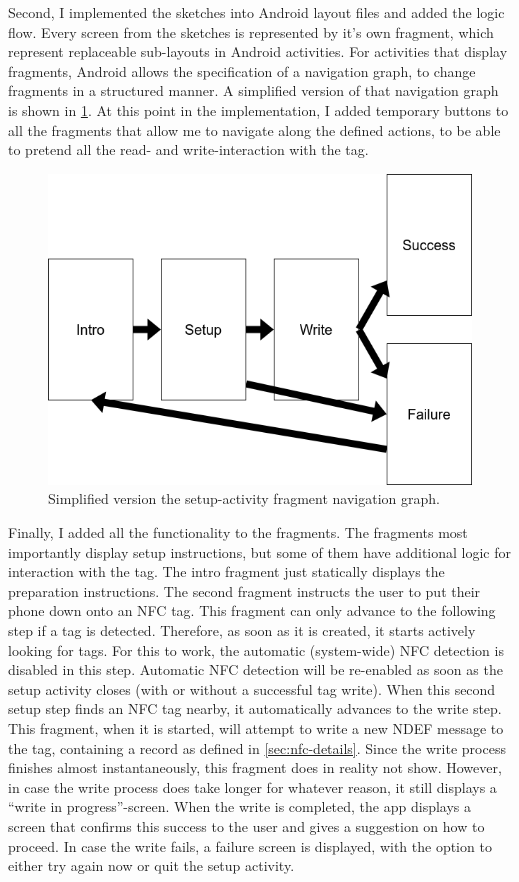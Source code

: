 \documentclass[conference]{IEEEtran}
\begin{document}
Second, I implemented the sketches into Android layout files and added the logic flow. Every screen from the sketches is represented by it's own fragment, which represent replaceable sub-layouts in Android activities. For activities that display fragments, Android allows the specification of a navigation graph, to change fragments in a structured manner. A simplified version of that navigation graph is shown in \cref{fig:nav-graph}. At this point in the implementation, I added temporary buttons to all the fragments that allow me to navigate along the defined actions, to be able to pretend all the read- and write-interaction with the tag.

\begin{figure}
	\centering
	\includegraphics[width=\linewidth]{nav-graph.drawio.png}
	\caption{Simplified version the setup-activity fragment navigation graph.}
	\label{fig:nav-graph}
\end{figure}

Finally, I added all the functionality to the fragments. The fragments most importantly display setup instructions, but some of them have additional logic for interaction with the tag. The intro fragment just statically displays the preparation instructions. The second fragment instructs the user to put their phone down onto an NFC tag. This fragment can only advance to the following step if a tag is detected. Therefore, as soon as it is created, it starts actively looking for tags. For this to work, the automatic (system-wide) NFC detection is disabled in this step. Automatic NFC detection will be re-enabled as soon as the setup activity closes (with or without a successful tag write). When this second setup step finds an NFC tag nearby, it automatically advances to the write step. This fragment, when it is started, will attempt to write a new NDEF message to the tag, containing a record as defined in \cref{sec:nfc-details}. Since the write process finishes almost instantaneously, this fragment does in reality not show. However, in case the write process does take longer for whatever reason, it still displays a ``write in progress''-screen. When the write is completed, the app displays a screen that confirms this success to the user and gives a suggestion on how to proceed. In case the write fails, a failure screen is displayed, with the option to either try again now or quit the setup activity.
\end{document}
